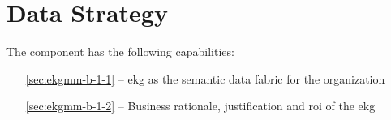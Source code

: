 \chapter{Data Strategy}\label{ch:ekgmm-b-1} %

The  component has the following capabilities:

\begin{itemize}[leftmargin=.5in]
    \item [\ref{sec:ekgmm-b-1-1}]  -- \gls{ekg} as the semantic data fabric for the organization
    \item [\ref{sec:ekgmm-b-1-2}]  -- Business rationale, justification and \gls{roi} of the \gls{ekg}
\end{itemize}


